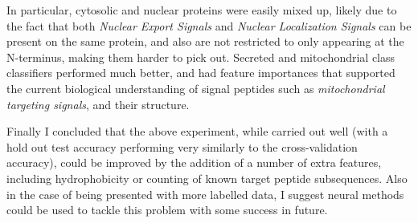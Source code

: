 \documentclass{bioinfo}
\begin{document}
In particular, cytosolic and nuclear proteins were easily mixed up, likely due to the fact that both \textit{Nuclear Export Signals} and \textit{Nuclear Localization Signals} can be present on the same protein, and also are not restricted to only appearing at the N-terminus, making them harder to pick out. 
Secreted and mitochondrial class classifiers performed much better, and had feature importances that supported the current biological understanding of signal peptides such as \textit{mitochondrial targeting signals}, and their structure. 

Finally I concluded that the above experiment, while carried out well (with a hold out test accuracy performing very similarly to the cross-validation accuracy), could be improved by the addition of a number of extra features, including hydrophobicity or counting of known target peptide subsequences. Also in the case of being presented with more labelled data, I suggest neural methods could be used to tackle this problem with some success in future. 





\vspace*{-10pt}




%
%
%
%
%
%
%
%
%
\end{document}
